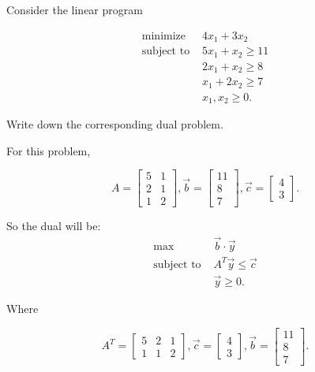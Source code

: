 \documentclass[12pt]{extarticle}
\theoremstyle{definition}
\begin{document}
\begin{problem} Consider the linear program

 \begin{align*}
\text{minimize } &4x_1+3x_2\\
\text{subject to } & 5x_1+x_2\geq 11\\
&2x_1+x_2\geq 8\\
&x_1+2x_2\geq 7\\
&x_1,x_2\geq 0.
\end{align*}

Write down the corresponding dual problem.

For this problem, 

	$$A=\begin{bmatrix}
	5&1\\2&1\\1&2
	\end{bmatrix},\vec{b}=\begin{bmatrix}
	11\\8\\7
	\end{bmatrix},\vec{c}=\begin{bmatrix}
	4\\3
	\end{bmatrix}.$$

So the dual will be:
	\begin{align*}
	\text{max } &\vec{b} \cdot \vec{y}\\
	\text{subject to } & A^T \vec{y} \leq \vec{c}\\
	&\vec{y}\geq 0.
	\end{align*}

Where

	$$A^T=\begin{bmatrix}
	5&2&1\\1&1&2
	\end{bmatrix},\vec{c}=\begin{bmatrix}
	4\\3
	\end{bmatrix},\vec{b}=\begin{bmatrix}
	11\\8\\7
	\end{bmatrix}.$$

\end{problem}


\small


\end{document}
